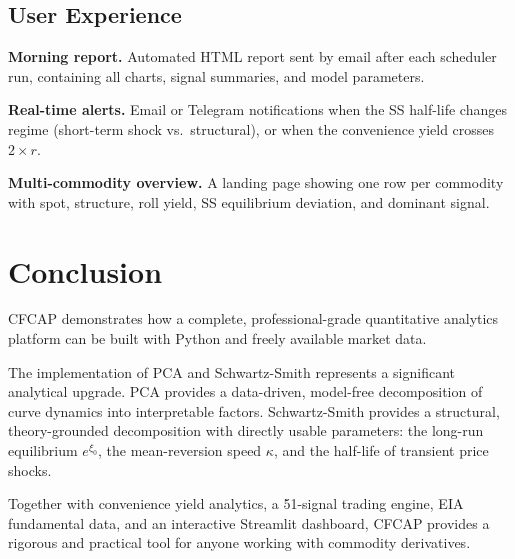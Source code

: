 \documentclass[11pt,a4paper]{article}
\begin{document}
\subsection{User Experience}

\textbf{Morning report.} Automated HTML report sent by email after each scheduler run, containing all charts, signal summaries, and model parameters.

\textbf{Real-time alerts.} Email or Telegram notifications when the SS half-life changes regime (short-term shock vs.\ structural), or when the convenience yield crosses $2 \times r$.

\textbf{Multi-commodity overview.} A landing page showing one row per commodity with spot, structure, roll yield, SS equilibrium deviation, and dominant signal.

\section{Conclusion}

CFCAP demonstrates how a complete, professional-grade quantitative analytics platform can be built with Python and freely available market data.

The implementation of PCA and Schwartz-Smith represents a significant analytical upgrade. PCA provides a data-driven, model-free decomposition of curve dynamics into interpretable factors. Schwartz-Smith provides a structural, theory-grounded decomposition with directly usable parameters: the long-run equilibrium $e^{\xi_0}$, the mean-reversion speed $\kappa$, and the half-life of transient price shocks.

Together with convenience yield analytics, a 51-signal trading engine, EIA fundamental data, and an interactive Streamlit dashboard, CFCAP provides a rigorous and practical tool for anyone working with commodity derivatives.
\end{document}
